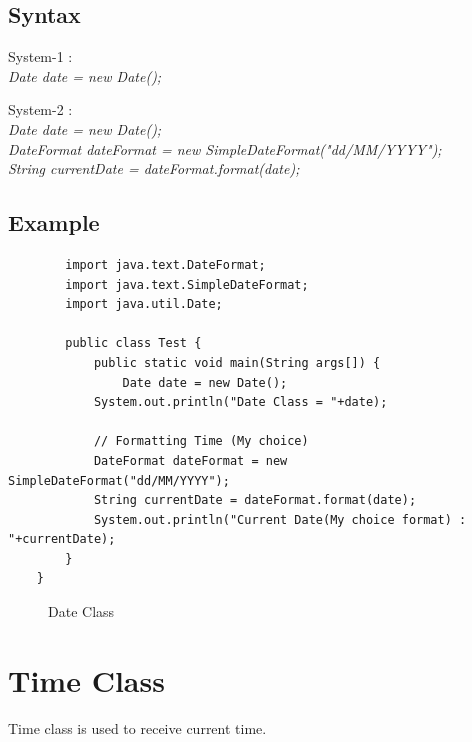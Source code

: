 \documentclass[openany]{book}  %
\begin{document}
\subsection{Syntax}
\begin{center}
    \tt{
        \raggedright{System-1 :}\\
        \textit{
            Date date = new Date();\\
        }
        \vskip 0.5cm
        \raggedright{System-2 :}\\
        \textit{
            Date date = new Date();\\
            DateFormat dateFormat = new SimpleDateFormat("dd/MM/YYYY");\\
            String currentDate = dateFormat.format(date);\\
        }
    }
\end{center}

\newpage

% 
% 
\subsection{Example}
\begin{center}
    \begin{verbatim}
        import java.text.DateFormat;
        import java.text.SimpleDateFormat;
        import java.util.Date;

        public class Test {
            public static void main(String args[]) {
                Date date = new Date();
            System.out.println("Date Class = "+date);

            // Formatting Time (My choice)
            DateFormat dateFormat = new SimpleDateFormat("dd/MM/YYYY");
            String currentDate = dateFormat.format(date);
            System.out.println("Current Date(My choice format) : "+currentDate);
        }
    }
    \end{verbatim}
\end{center}
% 
% 
\begin{figure}[htbp]
    \begin{center}
        \caption{Date Class}
    \end{center}
\end{figure}
% 
% 
\section{Time Class}
Time class is used to receive current time.
% 
% 
\end{document}

